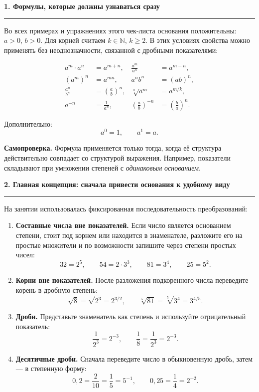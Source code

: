 \documentclass[a4paper,12pt]{article}
\newcommand{\topic}[1]{%
  \vspace{0.6em}
  {\large\bfseries\color{darkaccent}#1}\par
  \vspace{0.15em}\color{linegray}\hrule\color{textgray}\vspace{0.35em}
}
\newcommand{\keyidea}[1]{\textbf{\color{darkaccent}#1}}
\begin{document}
\topic{1. Формулы, которые должны узнаваться сразу}

Во всех примерах и упражнениях этого чек-листа основания положительны: \(a>0\), \(b>0\). Для корней считаем \(k\in\mathbb{N}\), \(k\ge2\). В этих условиях свойства можно применять без неоднозначности, связанной с дробными показателями:

\begin{align*}
 a^m\cdot a^n &= a^{m+n}, &
 \frac{a^m}{a^n} &= a^{m-n},\\[0.35em]
 (a^m)^n &= a^{mn}, &
 a^n b^n &= (ab)^n,\\[0.35em]
 \frac{a^n}{b^n} &= \left(\frac{a}{b}\right)^n, &
 \sqrt[k]{a^m} &= a^{m/k},\\[0.35em]
 a^{-n} &= \frac{1}{a^n}, &
 \left(\frac{a}{b}\right)^{-n} &= \left(\frac{b}{a}\right)^n.
\end{align*}

Дополнительно:
\[
 a^0=1,
 \qquad
 a^1=a.
\]

\keyidea{Самопроверка.} Формула применяется только тогда, когда её структура действительно совпадает со структурой выражения. Например, показатели складывают при умножении степеней с \emph{одинаковым основанием}.

\clearpage
\topic{2. Главная концепция: сначала привести основания к удобному виду}

На занятии использовалась фиксированная последовательность преобразований:

\begin{enumerate}
  \item \textbf{Составные числа вне показателей.} Если число является основанием степени, стоит под корнем или находится в знаменателе, разложите его на простые множители и по возможности запишите через степени простых чисел:
  \[
    32=2^5,\qquad 54=2\cdot3^3,\qquad 81=3^4,\qquad 25=5^2.
  \]
  \item \textbf{Корни вне показателей.} После разложения подкоренного числа переведите корень в дробную степень:
  \[
    \sqrt8=\sqrt{2^3}=2^{3/2},\qquad
    \sqrt[5]{81}=\sqrt[5]{3^4}=3^{4/5}.
  \]
  \item \textbf{Дроби.} Представьте знаменатель как степень и используйте отрицательный показатель:
  \[
    \frac{1}{2^3}=2^{-3},\qquad \frac18=\frac1{2^3}=2^{-3}.
  \]
  \item \textbf{Десятичные дроби.} Сначала переведите число в обыкновенную дробь, затем --- в степенную форму:
  \[
    0{,}2=\frac{2}{10}=\frac15=5^{-1},\qquad
    0{,}25=\frac14=2^{-2}.
  \]
\end{enumerate}
\end{document}
